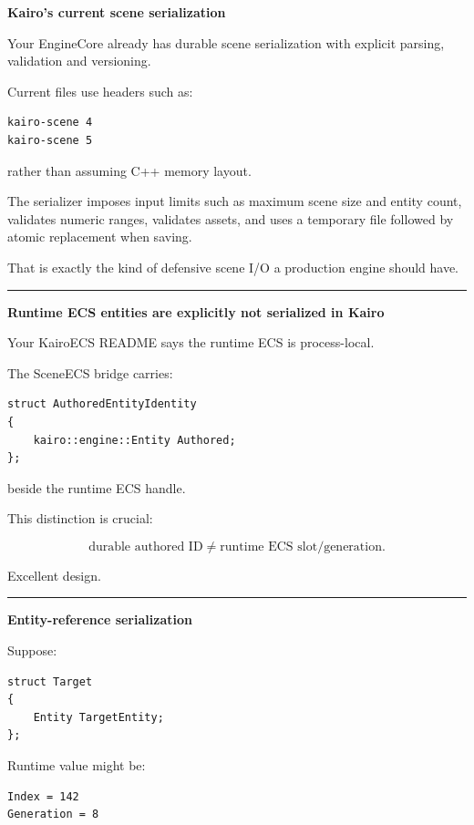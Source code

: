 \textbf{Kairo's current scene serialization}

Your EngineCore already has durable scene serialization with explicit parsing, validation and versioning.

Current files use headers such as:

\begin{verbatim}
kairo-scene 4
kairo-scene 5
\end{verbatim}

rather than assuming C++ memory layout.

The serializer imposes input limits such as maximum scene size and entity count, validates numeric ranges, validates assets, and uses a temporary file followed by atomic replacement when saving.

That is exactly the kind of defensive scene I/O a production engine should have.

\begin{center}\rule{0.5\linewidth}{0.5pt}\end{center}

\textbf{Runtime ECS entities are explicitly not serialized in Kairo}

Your KairoECS README says the runtime ECS is process-local.

The SceneECS bridge carries:

\begin{verbatim}
struct AuthoredEntityIdentity
{
    kairo::engine::Entity Authored;
};
\end{verbatim}

beside the runtime ECS handle.

This distinction is crucial:

\[
\boxed{
\text{durable authored ID}
\neq
\text{runtime ECS slot/generation}.
}
\]

Excellent design.

\begin{center}\rule{0.5\linewidth}{0.5pt}\end{center}

\textbf{Entity-reference serialization}

Suppose:

\begin{verbatim}
struct Target
{
    Entity TargetEntity;
};
\end{verbatim}

Runtime value might be:

\begin{verbatim}
Index = 142
Generation = 8
\end{verbatim}

